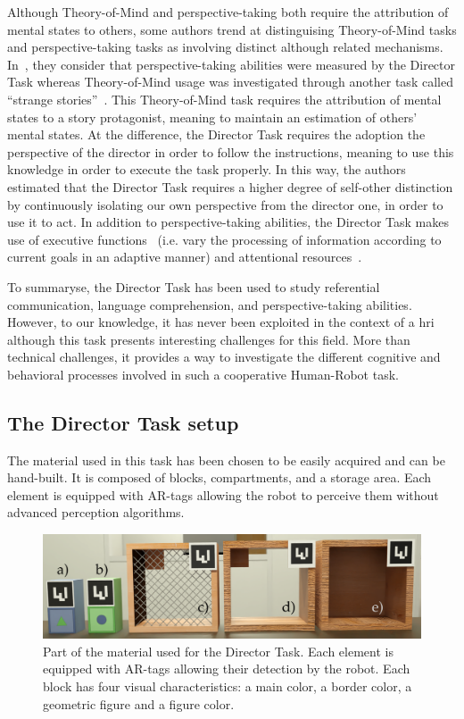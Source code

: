 Although Theory-of-Mind and perspective-taking both require the attribution of mental states to others, some authors trend at distinguising Theory-of-Mind tasks and perspective-taking tasks as involving distinct although related mechanisms. In~\cite{santiesteban_2012_training}, they consider that perspective-taking abilities were measured by the Director Task whereas Theory-of-Mind usage was investigated through another task called ``strange stories''~\cite{happe_1994_advanced}. This Theory-of-Mind task requires the attribution of mental states to a story protagonist, meaning to maintain an estimation of others' mental states. At the difference, the Director Task requires the adoption the perspective of the director in order to follow the instructions, meaning to use this knowledge in order to execute the task properly. 
In this way, the authors estimated that the Director Task requires a higher degree of self-other distinction by continuously isolating our own perspective from the director one, in order to use it to act. In addition to perspective-taking abilities, the Director Task makes use of executive functions~\cite{rubio_2017_director} (i.e. vary the processing of information according to current goals in an adaptive manner) and attentional resources~\cite{lin_2010_reflexively}.

To summaryse, the Director Task has been used to study referential communication, language comprehension, and perspective-taking abilities. However, to our knowledge, it has never been exploited in the context of a \acrshort{hri} although this task presents interesting challenges for this field. More than technical challenges, it provides a way to investigate the different cognitive and behavioral processes involved in such a cooperative Human-Robot task.

\subsection{The Director Task setup}

The material used in this task has been chosen to be easily acquired and can be hand-built. It is composed of blocks, compartments, and a storage area. Each element is equipped with AR-tags allowing the robot to perceive them without advanced perception algorithms.

\begin{figure}[ht!]
\centering
\includegraphics[width=\textwidth]{figures/chapter9/material.png}
\caption{\label{fig:chap9_material} Part of the material used for the Director Task. Each element is equipped with AR-tags allowing their detection by the robot. Each block has four visual characteristics: a main color, a border color, a geometric figure  and a figure color. }
\end{figure}

